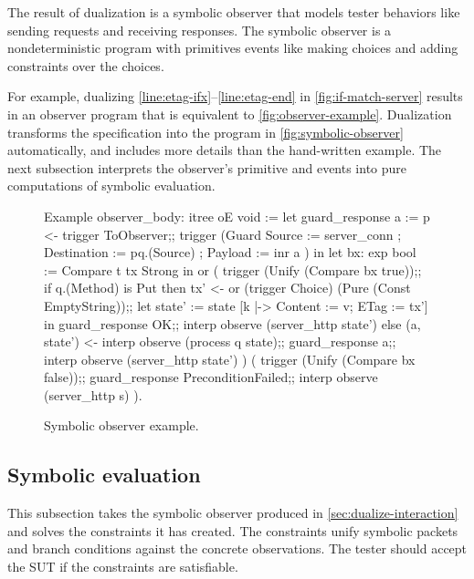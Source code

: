 The result of dualization is a symbolic observer that models tester behaviors
like sending requests and receiving responses.  The symbolic observer is a
nondeterministic program with primitives events like making choices and adding
constraints over the choices.

For example, dualizing \autoref{line:etag-ifx}--\ref{line:etag-end} in
\autoref{fig:if-match-server} results in an observer program that is equivalent
to \autoref{fig:observer-example}.  Dualization transforms the 
specification into the  program in
\autoref{fig:symbolic-observer} automatically, and includes more details than
the hand-written  example.  The next subsection interprets
the observer's primitive  and  events into pure
computations of symbolic evaluation.

\begin{figure}
\begin{coq}
  Example observer_body: itree oE void :=
    let guard_response a :=
      p <- trigger ToObserver;;
      trigger (Guard { Source      := server_conn
                     ; Destination := pq.(Source)
                     ; Payload     := inr a } ) in
    let bx: exp bool := Compare t tx Strong in
    or (
        trigger (Unify (Compare bx true));;
        if q.(Method) is Put
        then
          tx' <- or (trigger Choice)
                    (Pure (Const EmptyString));;
          let state' := state [k |-> {Content := v; ETag := tx'}] in
          guard_response OK;;
          interp observe (server_http state')
        else
          (a, state') <- interp observe (process q state);;
          guard_response a;;
          interp observe (server_http state')
       )
       (
        trigger (Unify (Compare bx false));;
        guard_response PreconditionFailed;;
        interp observe (server_http s)
       ).
\end{coq}
\caption{Symbolic observer example.}
\label{fig:observer-example}
\end{figure}


\subsection{Symbolic evaluation}
\label{sec:symbolic-eval}
This subsection takes the symbolic observer produced in
\autoref{sec:dualize-interaction} and solves the constraints it has created.
The constraints unify symbolic packets and branch conditions against the
concrete observations.  The tester should accept the SUT if the constraints are
satisfiable.

